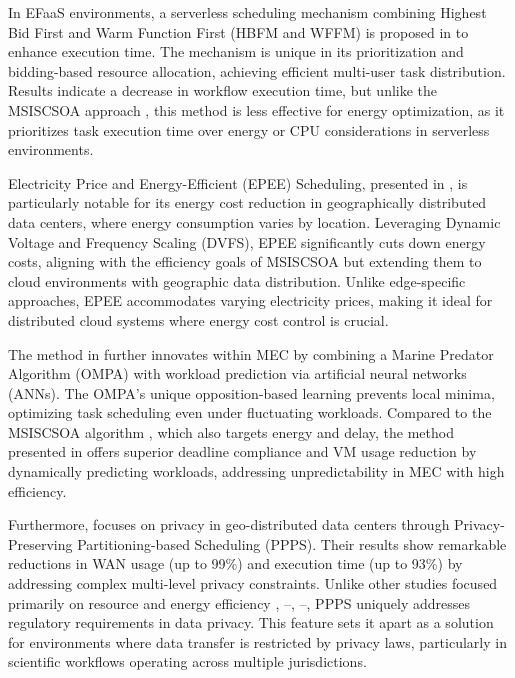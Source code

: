 \documentclass[a4paper, final]{article}
\begin{document}
In EFaaS environments, a serverless scheduling mechanism combining Highest Bid First and Warm Function 
First (HBFM and WFFM) is proposed in \cite{bib:4_faas} to enhance execution time. The mechanism is unique 
in its prioritization and bidding-based resource allocation, achieving efficient multi-user task distribution. 
Results indicate a decrease in workflow execution time, but unlike the MSISCSOA approach \cite{bib:3_sandcat}, 
this method is less effective for energy optimization, as it prioritizes task execution time over energy or 
CPU considerations in serverless environments.

Electricity Price and Energy-Efficient (EPEE) Scheduling, presented in \cite{bib:5_epee}, is particularly 
notable for its energy cost reduction in geographically distributed data centers, where energy consumption 
varies by location. Leveraging Dynamic Voltage and Frequency Scaling (DVFS), EPEE significantly cuts down
energy costs, aligning with the efficiency goals of MSISCSOA \cite{bib:3_sandcat} but extending them to cloud 
environments with geographic data distribution. Unlike edge-specific approaches, EPEE accommodates varying 
electricity prices, making it ideal for distributed cloud systems where energy cost control is crucial.

The method in \cite{bib:6_marine} further innovates within MEC by combining a Marine Predator Algorithm 
(OMPA) with workload prediction via artificial neural networks (ANNs). The OMPA’s unique opposition-based 
learning prevents local minima, optimizing task scheduling even under fluctuating workloads. Compared to the 
MSISCSOA algorithm \cite{bib:3_sandcat}, which also targets energy and delay, the method presented in 
\cite{bib:6_marine} offers superior deadline compliance and VM usage reduction by dynamically predicting 
workloads, addressing unpredictability in MEC with high efficiency.

Furthermore, \cite{bib:7_ppps} focuses on privacy in geo-distributed data centers through Privacy-Preserving 
Partitioning-based Scheduling (PPPS). Their results show remarkable reductions in WAN usage (up to 99\%) 
and execution time (up to 93\%) by addressing complex multi-level privacy constraints. Unlike other studies 
focused primarily on resource and energy efficiency \cite{bib:1_acrl}, 
\cite{bib:6_marine}--\cite{bib:5_epee}, \cite{bib:8}--\cite{bib:10}, PPPS uniquely addresses regulatory 
requirements in data privacy. This feature sets it apart as a solution for environments where data transfer 
is restricted by privacy laws, particularly in scientific workflows operating across multiple jurisdictions.
\end{document}
